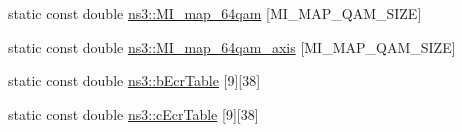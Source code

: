 \begin{DoxyCompactItemize}
\item 
static const double \hyperlink{namespacens3_addf441339cfdc6e9de9389d58269c19a}{ns3\+::\+M\+I\+\_\+map\+\_\+64qam} \mbox{[}M\+I\+\_\+\+M\+A\+P\+\_\+Q\+A\+M\+\_\+\+S\+I\+ZE\mbox{]}
\item 
static const double \hyperlink{namespacens3_adbc6d60f5cb8deb6378e7e066a537238}{ns3\+::\+M\+I\+\_\+map\+\_\+64qam\+\_\+axis} \mbox{[}M\+I\+\_\+\+M\+A\+P\+\_\+Q\+A\+M\+\_\+\+S\+I\+ZE\mbox{]}
\item 
static const double \hyperlink{namespacens3_aa3d7232f450cb4b832a47c4df5175c4d}{ns3\+::b\+Ecr\+Table} \mbox{[}9\mbox{]}\mbox{[}38\mbox{]}
\item 
static const double \hyperlink{namespacens3_a3905bbb06635b77635374f14d2458705}{ns3\+::c\+Ecr\+Table} \mbox{[}9\mbox{]}\mbox{[}38\mbox{]}
\end{DoxyCompactItemize}
